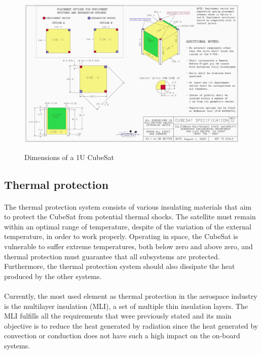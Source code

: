\begin{figure}[h!]
\includegraphics[scale=0.6]{./sections/SatelliteDept/sections/images/CubeSatDesign}
\centering
\caption{Dimensions of a 1U CubeSat}
\cite{cubesatdimensions}
\end{figure}

\subsection{Thermal protection}
\paragraph{}The thermal protection system consists of various insulating materials that aim to protect the CubeSat from potential thermal shocks. The satellite must remain within an optimal range of temperature, despite of the variation of the external temperature, in order to work properly. Operating in space, the CubeSat is vulnerable to suffer extreme temperatures, both below zero and above zero, and thermal protection must guarantee that all subsystems are protected. Furthermore, the thermal protection system should also dissipate the heat produced by the other systems.

\paragraph{} Currently, the most used element as thermal protection in the aerospace industry is the multilayer insulation (MLI), a set of multiple thin insulation layers. The MLI fulfills all the requirements that were previously stated and its main objective is to reduce the heat generated by radiation since the heat generated by convection or conduction does not have such a high impact on the on-board systems.

